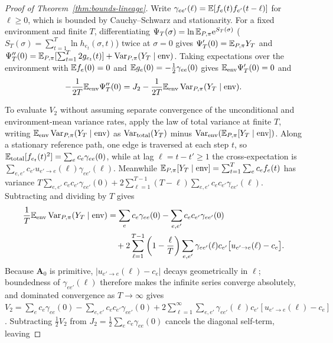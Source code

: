 \begin{proof}[Proof of Theorem~{\upshape\ref{thm:bounds-lineage}}]
Write $\gamma_{ee'}(\ell) = \mathbb{E}[f_e(t)f_{e'}(t - \ell)]$ for $\ell \ge 0$, which is bounded by Cauchy--Schwarz and stationarity. For a fixed environment and finite $T$, differentiating $\Psi_T(\sigma) = \ln\mathbb{E}_{P,\pi}\mathrm{e}^{S_T(\sigma)}$ ($S_T(\sigma) = \sum_{t=1}^T \ln h_{e_t}(\sigma, t)$) twice at $\sigma = 0$ gives $\Psi_T'(0) = \mathbb{E}_{P,\pi} Y_T$ and $\Psi_T''(0) = \mathbb{E}_{P,\pi}[\sum_{t=1}^T 2g_{e_t}(t)] + \operatorname{Var}_{P,\pi}(Y_T \mid \text{env})$. Taking expectations over the environment with $\mathbb{E} f_e(0) = 0$ and $\mathbb{E} g_e(0) = -\frac{1}{2}\gamma_{ee}(0)$ gives $\mathbb{E}_{\mathrm{env}}\Psi_T'(0) = 0$ and
\[
-\frac{1}{2T}\mathbb{E}_{\mathrm{env}}\Psi_T''(0) = J_2 - \frac{1}{2T}\mathbb{E}_{\mathrm{env}}\operatorname{Var}_{P,\pi}(Y_T \mid \text{env}).
\]

To evaluate $V_2$ without assuming separate convergence of the unconditional and environment-mean variance rates, apply the law of total variance at finite $T$, writing $\mathbb{E}_{\mathrm{env}}\operatorname{Var}_{P,\pi}(Y_T \mid \text{env})$ as $\operatorname{Var}_{\mathrm{total}}(Y_T)$ minus $\operatorname{Var}_{\mathrm{env}}(\mathbb{E}_{P,\pi}[Y_T \mid \text{env}])$. Along a stationary reference path, one edge is traversed at each step $t$, so $\mathbb{E}_{\mathrm{total}}[f_{e_t}(t)^2] = \sum_e c_e \gamma_{ee}(0)$, while at lag $\ell = t - t' \ge 1$ the cross-expectation is $\sum_{e,e'} c_{e'} u_{e' \to e}(\ell)\gamma_{ee'}(\ell)$. Meanwhile $\mathbb{E}_{P,\pi}[Y_T \mid \text{env}] = \sum_{t=1}^T \sum_e c_e f_e(t)$ has variance $T\sum_{e,e'} c_e c_{e'}\gamma_{ee'}(0) + 2\sum_{\ell=1}^{T-1} (T - \ell)\sum_{e,e'} c_e c_{e'}\gamma_{ee'}(\ell)$. Subtracting and dividing by $T$ gives
\[
\begin{aligned}
\frac{1}{T}\mathbb{E}_{\mathrm{env}}\operatorname{Var}_{P,\pi}(Y_T \mid \text{env}) &= \sum_e c_e\gamma_{ee}(0) - \sum_{e,e'} c_e c_{e'}\gamma_{ee'}(0) \\
&\quad + 2\sum_{\ell=1}^{T-1}\left(1 - \frac{\ell}{T}\right)\sum_{e,e'} \gamma_{ee'}(\ell) c_{e'}\bigl[u_{e' \to e}(\ell) - c_e\bigr].
\end{aligned}
\]
Because $\mathbf{A}_0$ is primitive, $|u_{e' \to e}(\ell) - c_e|$ decays geometrically in $\ell$; boundedness of $\gamma_{ee'}(\ell)$ therefore makes the infinite series converge absolutely, and dominated convergence as $T \to \infty$ gives $V_2 = \sum_e c_e\gamma_{ee}(0) - \sum_{e,e'} c_e c_{e'}\gamma_{ee'}(0) + 2\sum_{\ell=1}^{\infty} \sum_{e,e'} \gamma_{ee'}(\ell) c_{e'}[u_{e' \to e}(\ell) - c_e]$. Subtracting $\frac{1}{2}V_2$ from $J_2 = \frac{1}{2}\sum_e c_e\gamma_{ee}(0)$ cancels the diagonal self-term, leaving

\end{proof}
